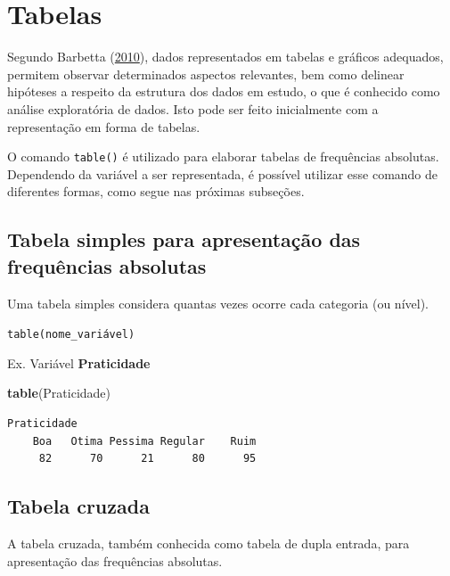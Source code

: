 \documentclass[12pt,brazil,oneside]{book}
\newenvironment{Shaded}{\begin{snugshade}}{\end{snugshade}}
\newcommand{\KeywordTok}[1]{\textcolor[rgb]{0.13,0.29,0.53}{\textbf{#1}}}
\newcommand{\NormalTok}[1]{#1}
\begin{document}
\hypertarget{tabelas}{%
\section{Tabelas}\label{tabelas}}

Segundo Barbetta (\protect\hyperlink{ref-barbetta1988}{2010}), dados representados em tabelas e gráficos adequados, permitem observar determinados aspectos relevantes, bem como delinear hipóteses a respeito da estrutura dos dados em estudo, o que é conhecido como análise exploratória de dados. Isto pode ser feito inicialmente com a representação em forma de tabelas.

O comando \texttt{table()} é utilizado para elaborar tabelas de frequências absolutas. Dependendo da variável a ser representada, é possível utilizar esse comando de diferentes formas, como segue nas próximas subseções.

\hypertarget{tabela-simples-para-apresentacao-das-frequencias-absolutas}{%
\subsection{Tabela simples para apresentação das frequências absolutas}\label{tabela-simples-para-apresentacao-das-frequencias-absolutas}}

Uma tabela simples considera quantas vezes ocorre cada categoria (ou nível).

\texttt{table(nome\_variável)}

Ex. Variável \textbf{Praticidade}

\begin{Shaded}
\begin{Highlighting}[]
\KeywordTok{table}\NormalTok{(Praticidade)}
\end{Highlighting}
\end{Shaded}

\begin{verbatim}
Praticidade
    Boa   Otima Pessima Regular    Ruim 
     82      70      21      80      95 
\end{verbatim}

\hypertarget{tabela-cruzada}{%
\subsection{Tabela cruzada}\label{tabela-cruzada}}

A tabela cruzada, também conhecida como tabela de dupla entrada, para apresentação das frequências absolutas.
\end{document}
